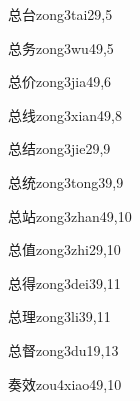 \begin{verbete}{总台}{zong3tai2}{9,5}
\end{verbete}

\begin{verbete}{总务}{zong3wu4}{9,5}
\end{verbete}

\begin{verbete}{总价}{zong3jia4}{9,6}
\end{verbete}

\begin{verbete}{总线}{zong3xian4}{9,8}
\end{verbete}

\begin{verbete}{总结}{zong3jie2}{9,9}
\end{verbete}

\begin{verbete}{总统}{zong3tong3}{9,9}
\end{verbete}

\begin{verbete}{总站}{zong3zhan4}{9,10}
\end{verbete}

\begin{verbete}{总值}{zong3zhi2}{9,10}
\end{verbete}

\begin{verbete}{总得}{zong3dei3}{9,11}
\end{verbete}

\begin{verbete}{总理}{zong3li3}{9,11}
\end{verbete}

\begin{verbete}{总督}{zong3du1}{9,13}
\end{verbete}

\begin{verbete}{奏效}{zou4xiao4}{9,10}
\end{verbete}

